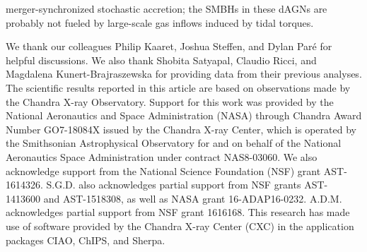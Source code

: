 \documentclass[iop,revtex4,twocolumn,apj,numberedappendix,appendixfloats]{emulateapj}
\begin{document}
merger-synchronized stochastic accretion; the SMBHs in these dAGNs are probably not fueled by large-scale gas inflows induced by tidal torques.

\acknowledgments

We thank our colleagues Philip Kaaret, Joshua Steffen, and Dylan Par\'e for helpful discussions. We also thank Shobita Satyapal, Claudio Ricci, and Magdalena Kunert-Brajraszewska for providing data from their previous analyses. 
The scientific results reported in this article are based on observations made by the Chandra X-ray Observatory.
Support for this work was provided by the National Aeronautics and Space Administration (NASA) through Chandra Award Number GO7-18084X issued by the Chandra X-ray Center, which is operated by the Smithsonian Astrophysical Observatory for and on behalf of the National Aeronautics Space Administration under contract NAS8-03060.
We also acknowledge support from the National Science Foundation (NSF) grant AST-1614326. 
S.G.D. also acknowledges partial support from NSF grants AST-1413600 and AST-1518308, as well as NASA grant 16-ADAP16-0232. A.D.M. acknowledges partial support from NSF grant 1616168. 
This research has made use of software provided by the Chandra X-ray Center (CXC) in the application packages CIAO, ChIPS, and Sherpa.



\end{document}
